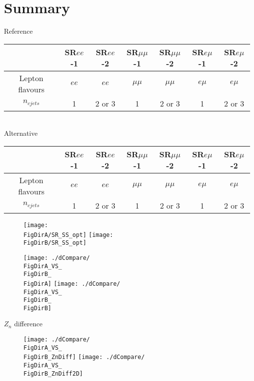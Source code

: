\section{Summary}

\begin{frame}
\centering
\tiny
Reference
\begin{tabular}{|c|c|c|c|c|c|c|}
\hline
& SR$ee$-1 & SR$ee$-2 & SR$\mu\mu$-1 & SR$\mu\mu$-2 & SR$e\mu$-1 & SR$e\mu$-2 \\
\hline
Lepton flavours & $ee$ & $ee$ & $\mu\mu$ & $\mu\mu$ & $e\mu$ & $e\mu$ \\
\hline
$n_{cjets}$ & 1 & 2 or 3 & 1 & 2 or 3 & 1 & 2 or 3 \\
\hline

\end{tabular}
\\
Alternative
\begin{tabular}{|c|c|c|c|c|c|c|}
\hline
& SR$ee$-1 & SR$ee$-2 & SR$\mu\mu$-1 & SR$\mu\mu$-2 & SR$e\mu$-1 & SR$e\mu$-2 \\
\hline
Lepton flavours & $ee$ & $ee$ & $\mu\mu$ & $\mu\mu$ & $e\mu$ & $e\mu$ \\
\hline
$n_{cjets}$ & 1 & 2 or 3 & 1 & 2 or 3 & 1 & 2 or 3 \\
\hline

\end{tabular}
\end{frame}


\begin{frame}
  \begin{figure}
    \centering
    \texttt{[image: \\FigDirA/SR\_SS\_opt]}
    \texttt{[image: \\FigDirB/SR\_SS\_opt]}
  \end{figure}
\end{frame}
\begin{frame}
  \begin{figure}
    \centering
    \texttt{[image: ./dCompare/\\FigDirA\_VS\_\\FigDirB\_\\FigDirA]}
    \texttt{[image: ./dCompare/\\FigDirA\_VS\_\\FigDirB\_\\FigDirB]}
  \end{figure}
\end{frame}

\begin{frame}{$Z_n$ difference}
  \begin{figure}
    \centering
    \texttt{[image: ./dCompare/\\FigDirA\_VS\_\\FigDirB\_ZnDiff]}
    \texttt{[image: ./dCompare/\\FigDirA\_VS\_\\FigDirB\_ZnDiff2D]}
  \end{figure}
\end{frame}


